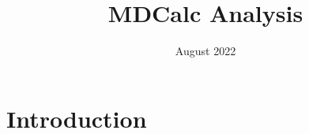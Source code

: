 \documentclass{article}
\title{MDCalc Analysis}
\author{}
\date{August 2022}
\begin{document}
\maketitle

\section{Introduction}
\end{document}
